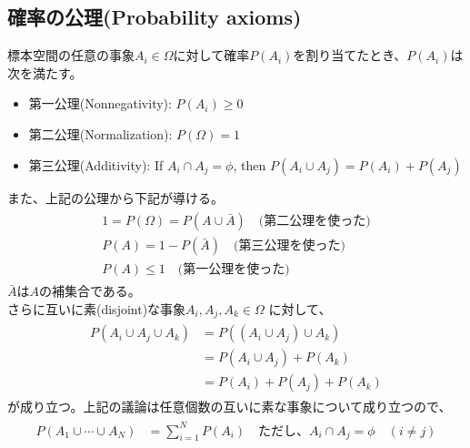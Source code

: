 \documentclass[a4j]{jarticle}
\begin{document}
\subsection{確率の公理(Probability axioms)}
標本空間の任意の事象$A_{i}\in\Omega$に対して確率$P(A_{i})$を割り当てたとき、$P(A_{i})$は次を満たす。
\begin{itemize}
    \item 第一公理(Nonnegativity): $P(A_{i}) \geq 0$
    \item 第二公理(Normalization): $P(\Omega)=1$
    \item 第三公理(Additivity): If $A_{i}\cap A_{j} = \phi$, 
    then $P(A_{i}\cup A_{j})=P(A_{i}) + P(A_{j})$
\end{itemize}
また、上記の公理から下記が導ける。
\begin{align}
    \begin{aligned}
    1 = P(\Omega) = P(A \cup \bar{A}) \quad \text{(第二公理を使った)}\\
    P(A) = 1 - P(\bar{A}) \quad \text{(第三公理を使った)}\\
    P(A) \leq 1 \quad \text{(第一公理を使った)}
    \end{aligned}
\end{align}
$\bar{A}$は$A$の補集合である。\\
さらに互いに素(disjoint)な事象$A_{i},A_{j},A_{k} \in \Omega$
に対して、
\begin{align}
    \begin{aligned}
    P(A_{i} \cup A_{j} \cup A_{k}) &= P((A_{i} \cup A_{j}) \cup A_{k}) \\
    &= P(A_{i} \cup A_{j}) + P(A_{k}) \\
    &= P(A_{i}) + P(A_{j}) + P(A_{k})
    \end{aligned}
\end{align}
が成り立つ。上記の議論は任意個数の互いに素な事象について成り立つので、
\begin{align}
    \begin{aligned}
    P(A_{1} \cup \cdots \cup A_{N}) &= \sum^{N}_{i=1} P(A_{i}) 
    \quad \text{ただし、$A_{i} \cap A_{j} = \phi \quad (i \neq j)$}
    \end{aligned}
\end{align}
\end{document}
